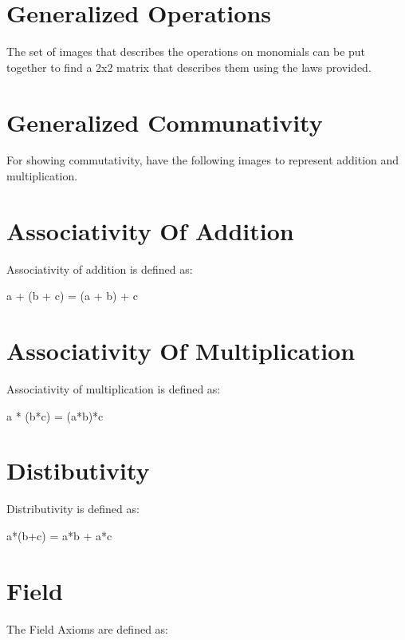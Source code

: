 \section{Generalized Operations}

The set of images that describes the operations on monomials can be put together to find a 2x2 matrix that describes them using the laws provided.

\section{Generalized Communativity}

For showing commutativity, have the following images to represent addition and multiplication.

\section{Associativity Of Addition}

Associativity of addition is defined as:

a + (b + c) = (a + b) + c

\section{Associativity Of Multiplication}

Associativity of multiplication is defined as:

a * (b*c) = (a*b)*c

\section{Distibutivity}

Distributivity is defined as:

a*(b+c) = a*b + a*c

\section{Field}

The Field Axioms are defined as:

